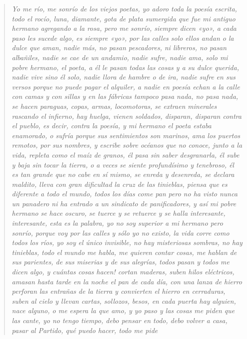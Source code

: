 \documentclass[12pt]{article}
\begin{document}
\clearpage
{}
\begin{verse}
\itshape
Yo me río,
me sonrío
de los viejos poetas,
yo adoro toda
la poesía escrita,
todo el rocío,
luna, diamante, gota
de plata sumergida
que fue mi antiguo hermano
agregando a la rosa,
pero
me sonrío,
siempre dicen «yo»,
a cada paso
les sucede algo,
es siempre «yo»,
por las calles
solo ellos andan
o la dulce que aman,
nadie más,
no pasan pescadores,
ni libreros,
no pasan albañiles,
nadie se cae
de un andamio,
nadie sufre,
nadie ama,
solo mi pobre hermano,
el poeta,
a él le pasan
todas las cosas
y a su dulce querida,
nadie vive
sino él solo,
nadie llora de hambre
o de ira,
nadie sufre en sus versos
porque no puede
pagar el alquiler,
a nadie en poesía
echan a la calle
con camas y con sillas
y en las fábricas
tampoco pasa nada,
no pasa nada,
se hacen paraguas, copas,
armas, locomotoras,
se extraen minerales
rascando el infierno,
hay huelga,
vienen soldados,
disparan,
disparan contra el pueblo,
es decir,
contra la poesía,
y mi hermano
el poeta
estaba enamorado,
o sufría
porque sus sentimientos
son marinos,
ama los puertos
remotos, por sus nombres,
y escribe sobre océanos
que no conoce,
junto a la vida, repleta
como el maíz de granos,
él pasa sin saber
desgranarla,
él sube y baja
sin tocar la tierra,
o a veces
se siente profundísimo
y tenebroso,
él es tan grande
que no cabe en sí mismo,
se enreda y desenreda,
se declara maldito,
lleva con gran dificultad la cruz
de las tinieblas,
piensa que es diferente
a todo el mundo,
todos los días come pan
pero no ha visto nunca
un panadero
ni ha entrado a un sindicato
de panificadores,
y así mi pobre hermano
se hace oscuro,
se tuerce y se retuerce
y se halla
interesante,
interesante,
esta es la palabra,
yo no soy superior
a mi hermano
pero sonrío,
porque voy por las calles
y sólo yo no existo,
la vida corre
como todos los ríos,
yo soy el único
invisible,
no hay misteriosas sombras,
no hay tinieblas,
todo el mundo me habla,
me quieren contar cosas,
me hablan de sus parientes,
de sus miserias
y de sus alegrías,
todos pasan y todos
me dicen algo,
y cuántas cosas hacen!
cortan maderas,
suben hilos eléctricos,
amasan hasta tarde en la noche
el pan de cada día,
con una lanza de hierro
perforan las entrañas
de la tierra
y convierten el hierro
en cerraduras,
suben al cielo y llevan
cartas, sollozos, besos,
en cada puerta
hay alguien,
nace alguno,
o me espera la que amo,
y yo paso y las cosas
me piden que las cante,
yo no tengo tiempo,
debo pensar en todo,
debo volver a casa,
pasar al Partido,
qué puedo hacer,
todo me pide

\end{verse}
\end{document}
